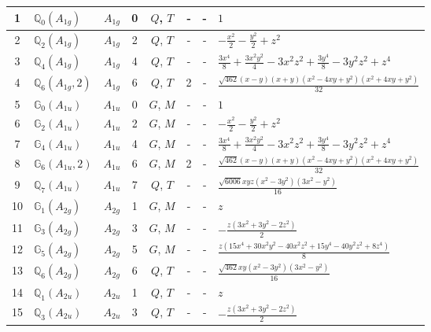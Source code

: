 \documentclass[fleqn,10pt,landscape]{jsarticle}
\begin{document}
\begin{longtable}[l]{clcccccl}
1 & $\mathbb{Q}_{0}(A_{1g})$ & $A_{1g}$ & 0 & $Q$, $T$ & - & - & $1$ \\ \hline
2 & $\mathbb{Q}_{2}(A_{1g})$ & $A_{1g}$ & 2 & $Q$, $T$ & - & - & $- \frac{x^{2}}{2} - \frac{y^{2}}{2} + z^{2}$ \\ \hline
3 & $\mathbb{Q}_{4}(A_{1g})$ & $A_{1g}$ & 4 & $Q$, $T$ & - & - & $\frac{3 x^{4}}{8} + \frac{3 x^{2} y^{2}}{4} - 3 x^{2} z^{2} + \frac{3 y^{4}}{8} - 3 y^{2} z^{2} + z^{4}$ \\ \hline
4 & $\mathbb{Q}_{6}(A_{1g},2)$ & $A_{1g}$ & 6 & $Q$, $T$ & 2 & - & $\frac{\sqrt{462} \left(x - y\right) \left(x + y\right) \left(x^{2} - 4 x y + y^{2}\right) \left(x^{2} + 4 x y + y^{2}\right)}{32}$ \\ \hline
5 & $\mathbb{G}_{0}(A_{1u})$ & $A_{1u}$ & 0 & $G$, $M$ & - & - & $1$ \\ \hline
6 & $\mathbb{G}_{2}(A_{1u})$ & $A_{1u}$ & 2 & $G$, $M$ & - & - & $- \frac{x^{2}}{2} - \frac{y^{2}}{2} + z^{2}$ \\ \hline
7 & $\mathbb{G}_{4}(A_{1u})$ & $A_{1u}$ & 4 & $G$, $M$ & - & - & $\frac{3 x^{4}}{8} + \frac{3 x^{2} y^{2}}{4} - 3 x^{2} z^{2} + \frac{3 y^{4}}{8} - 3 y^{2} z^{2} + z^{4}$ \\ \hline
8 & $\mathbb{G}_{6}(A_{1u},2)$ & $A_{1u}$ & 6 & $G$, $M$ & 2 & - & $\frac{\sqrt{462} \left(x - y\right) \left(x + y\right) \left(x^{2} - 4 x y + y^{2}\right) \left(x^{2} + 4 x y + y^{2}\right)}{32}$ \\ \hline
9 & $\mathbb{Q}_{7}(A_{1u})$ & $A_{1u}$ & 7 & $Q$, $T$ & - & - & $\frac{\sqrt{6006} x y z \left(x^{2} - 3 y^{2}\right) \left(3 x^{2} - y^{2}\right)}{16}$ \\ \hline
10 & $\mathbb{G}_{1}(A_{2g})$ & $A_{2g}$ & 1 & $G$, $M$ & - & - & $z$ \\ \hline
11 & $\mathbb{G}_{3}(A_{2g})$ & $A_{2g}$ & 3 & $G$, $M$ & - & - & $- \frac{z \left(3 x^{2} + 3 y^{2} - 2 z^{2}\right)}{2}$ \\ \hline
12 & $\mathbb{G}_{5}(A_{2g})$ & $A_{2g}$ & 5 & $G$, $M$ & - & - & $\frac{z \left(15 x^{4} + 30 x^{2} y^{2} - 40 x^{2} z^{2} + 15 y^{4} - 40 y^{2} z^{2} + 8 z^{4}\right)}{8}$ \\ \hline
13 & $\mathbb{Q}_{6}(A_{2g})$ & $A_{2g}$ & 6 & $Q$, $T$ & - & - & $\frac{\sqrt{462} x y \left(x^{2} - 3 y^{2}\right) \left(3 x^{2} - y^{2}\right)}{16}$ \\ \hline
14 & $\mathbb{Q}_{1}(A_{2u})$ & $A_{2u}$ & 1 & $Q$, $T$ & - & - & $z$ \\ \hline
15 & $\mathbb{Q}_{3}(A_{2u})$ & $A_{2u}$ & 3 & $Q$, $T$ & - & - & $- \frac{z \left(3 x^{2} + 3 y^{2} - 2 z^{2}\right)}{2}$ \\ \hline

\end{longtable}
\end{document}
